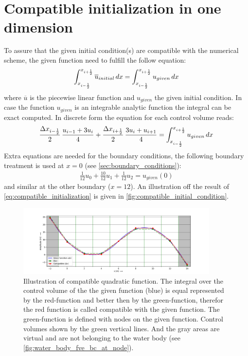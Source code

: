 \section{Compatible initialization in one dimension}\label{sec:compatible_initialization}
To assure that the given initial condition(s) are compatible with the numerical scheme, the given function need to fulfill the follow equation:
\begin{align}
    \int_{x_{i-\frac{1}{2}}}^{x_{i+\frac{1}{2}}} \overline u_{initial}\, dx = \int_{x_{i-\frac{1}{2}}}^{x_{i+\frac{1}{2}}} u_{given}\, dx \label{eq:compatible_initialization}
\end{align}
where $\overline{u}$ is the piecewise linear function and $u_{given}$ the given initial condition.
In case the function $u_{given}$ is an integrable analytic function the integral can be exact computed.
In discrete form the equation for each control volume reads:
\begin{align}
    \frac{\Delta x_{i-\frac{1}{2}}}{2}\,\frac{u_{i-1} + 3 u_i}{4} +
    \frac{\Delta x_{i+\frac{1}{2}}}{2}\,\frac{3 u_i + u_{i+1}}{4} = \int_{x_{i-\frac{1}{2}}}^{x_{i+\frac{1}{2}}} u_{given}\, dx
\end{align}
Extra equations are needed for the boundary conditions, the following boundary treatment is used at $x=0$ (see  \autoref{sec:boundary_conditions}):
\begin{align}
    \frac{1}{12} u_0 + \frac{10}{12}u_1 + \frac{1}{12} u_2 = u_{given}(0)
\end{align}
and similar at the other boundary ($x=12$).
An illustration off the result of \autoref{eq:compatible_initialization} is given in \autoref{fig:compatible_initial_condition}.
\begin{figure}[H]
    \centering
    \includegraphics[width=0.9\textwidth]{figures/compatible_initialization_lx=12.0_dx=2.0.pdf}
    \caption[Illustration of compatible quadratic function]{
    Illustration of compatible quadratic function.
    The integral over the control volume of the the given function (blue) is equal represented by the red-function and better then by the green-function, therefor the red function is called compatible with the given function.
    The green-function is defined with nodes on the given function. Control volumes shown by the green vertical lines.
    And the gray areas are virtual and are not belonging to the water body (see \autoref{fig:water_body_fve_bc_at_node}). }\label{fig:compatible_initial_condition}
\end{figure}
